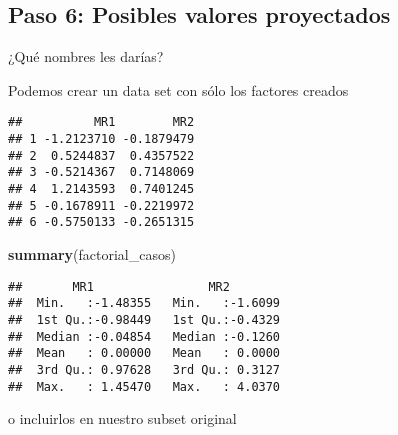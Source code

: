 \documentclass[
]{article}
\newenvironment{Shaded}{\begin{snugshade}}{\end{snugshade}}
\newcommand{\KeywordTok}[1]{\textcolor[rgb]{0.13,0.29,0.53}{\textbf{#1}}}
\newcommand{\NormalTok}[1]{#1}
\newcommand{\OperatorTok}[1]{\textcolor[rgb]{0.81,0.36,0.00}{\textbf{#1}}}
\newcommand{\StringTok}[1]{\textcolor[rgb]{0.31,0.60,0.02}{#1}}
\begin{document}
\hypertarget{paso-6-posibles-valores-proyectados}{%
\subsection{Paso 6: Posibles valores
proyectados}\label{paso-6-posibles-valores-proyectados}}

¿Qué nombres les darías?

Podemos crear un data set con sólo los factores creados

\begin{Shaded}
\end{Shaded}

\begin{verbatim}
##          MR1        MR2
## 1 -1.2123710 -0.1879479
## 2  0.5244837  0.4357522
## 3 -0.5214367  0.7148069
## 4  1.2143593  0.7401245
## 5 -0.1678911 -0.2219972
## 6 -0.5750133 -0.2651315
\end{verbatim}

\begin{Shaded}
\begin{Highlighting}[]
\KeywordTok{summary}\NormalTok{(factorial_casos)}
\end{Highlighting}
\end{Shaded}

\begin{verbatim}
##       MR1                MR2         
##  Min.   :-1.48355   Min.   :-1.6099  
##  1st Qu.:-0.98449   1st Qu.:-0.4329  
##  Median :-0.04854   Median :-0.1260  
##  Mean   : 0.00000   Mean   : 0.0000  
##  3rd Qu.: 0.97628   3rd Qu.: 0.3127  
##  Max.   : 1.45470   Max.   : 4.0370
\end{verbatim}

o incluirlos en nuestro subset original

\begin{Shaded}
\end{Shaded}
\end{document}
